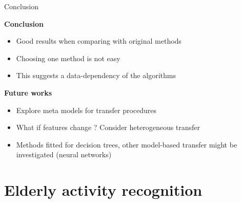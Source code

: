 \begin{frame}{Conclusion}{}

    
    \vspace{1cm}
    \centering
    \begin{minipage}[t]{0.75\linewidth}
    
        \centering
        \textbf{Conclusion}
        \begin{itemize}
            \item Good results when comparing with original methods
            \item Choosing one method is not easy
            \item This suggests a data-dependency of the algorithms
        \end{itemize}
        \medskip
        \centering
        \textbf{Future works}
        \begin{itemize}
            \item Explore meta models for transfer procedures
            \item What if features change ? Consider heterogeneous transfer
            \item Methods fitted for decision trees, other model-based transfer might be investigated (\ie neural networks)
        \end{itemize}

    \end{minipage}
    
\end{frame}


\section{Elderly activity recognition}

